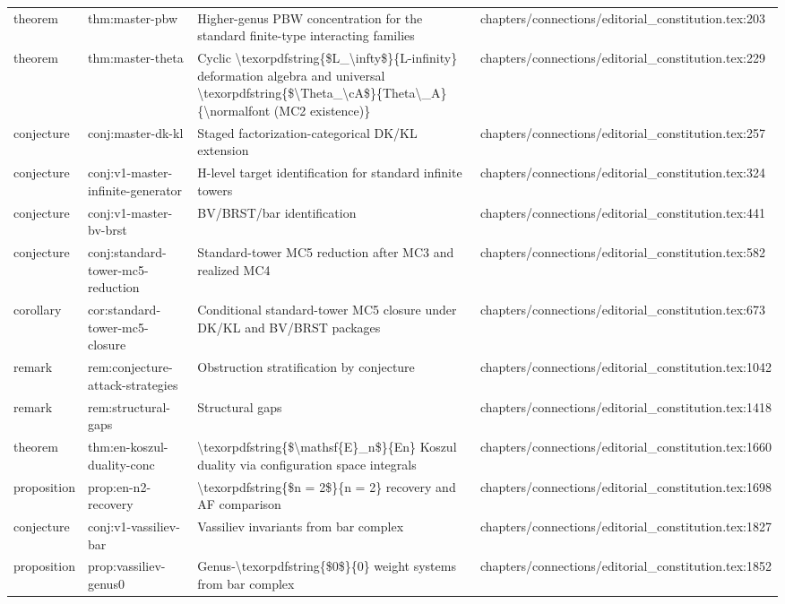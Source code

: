 \documentclass[11pt]{article}
\begin{document}
\begin{longtable}{L{0.10\textwidth}L{0.26\textwidth}L{0.42\textwidth}L{0.22\textwidth}}
theorem & thm:master-pbw & Higher-genus PBW concentration for the standard finite-type interacting families & chapters/connections/editorial\_constitution.tex:203\\
theorem & thm:master-theta & Cyclic \textbackslash{}texorpdfstring\{\$L\_\textbackslash{}infty\$\}\{L-infinity\} deformation algebra and universal \textbackslash{}texorpdfstring\{\$\textbackslash{}Theta\_\textbackslash{}cA\$\}\{Theta\textbackslash{}\_A\} \{\textbackslash{}normalfont (MC2 existence)\} & chapters/connections/editorial\_constitution.tex:229\\
conjecture & conj:master-dk-kl & Staged factorization-categorical DK/KL extension & chapters/connections/editorial\_constitution.tex:257\\
conjecture & conj:v1-master-infinite-generator & H-level target identification for standard infinite towers & chapters/connections/editorial\_constitution.tex:324\\
conjecture & conj:v1-master-bv-brst & BV/BRST/bar identification & chapters/connections/editorial\_constitution.tex:441\\
conjecture & conj:standard-tower-mc5-reduction & Standard-tower MC5 reduction after MC3 and realized MC4 & chapters/connections/editorial\_constitution.tex:582\\
corollary & cor:standard-tower-mc5-closure & Cond{}itional standard-tower MC5 closure under DK/KL and BV/BRST packages & chapters/connections/editorial\_constitution.tex:673\\
remark & rem:conjecture-attack-strategies & Obstruction stratification by conjecture & chapters/connections/editorial\_constitution.tex:1042\\
remark & rem:structural-gaps & Structural gaps & chapters/connections/editorial\_constitution.tex:1418\\
theorem & thm:en-koszul-duality-conc & \textbackslash{}texorpdfstring\{\$\textbackslash{}mathsf\{E\}\_n\$\}\{En\} Koszul duality via configuration space integrals & chapters/connections/editorial\_constitution.tex:1660\\
proposition & prop:en-n2-recovery & \textbackslash{}texorpdfstring\{\$n = 2\$\}\{n = 2\} recovery and AF comparison & chapters/connections/editorial\_constitution.tex:1698\\
conjecture & conj:v1-vassiliev-bar & Vassiliev invariants from bar complex & chapters/connections/editorial\_constitution.tex:1827\\
proposition & prop:vassiliev-genus0 & Genus-\textbackslash{}texorpdfstring\{\$0\$\}\{0\} weight systems from bar complex & chapters/connections/editorial\_constitution.tex:1852\\

\end{longtable}
\end{document}

